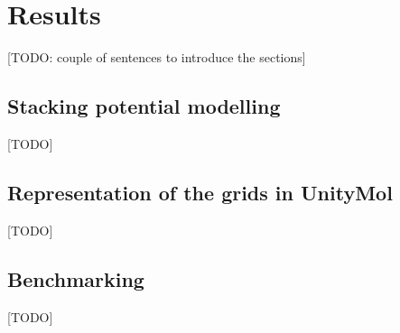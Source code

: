 \chapter{Results} %

[TODO: couple of sentences to introduce the sections]

\section{Stacking potential modelling}
  [TODO]

\section{Representation of the grids in UnityMol}
  [TODO]

\section{Benchmarking}
  [TODO]

